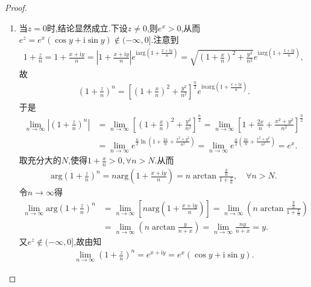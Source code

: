 \documentclass[../../main.tex]{subfiles}%
\begin{document}
\begin{proof}
\begin{enumerate}[(1)]
\item 当$z=0$时,结论显然成立.下设$z\neq 0$,则$e^x>0$,从而$e^z=e^x(\cos y+\text{i}\sin y)\notin (-\infty, 0]$.注意到
\begin{align*}
1+\frac{z}{n}=1+\frac{x+\mathrm{i}y}{n}=\left| 1+\frac{x+\mathrm{i}y}{n} \right|e^{\mathrm{iarg}\left( 1+\frac{x+\mathrm{i}y}{n} \right)}=\sqrt{\left( 1+\frac{x}{n} \right) ^2+\frac{y^2}{n^2}}e^{\mathrm{iarg}\left( 1+\frac{x+\mathrm{i}y}{n} \right)},
\end{align*}
故
\begin{align*}
\left( 1+\frac{z}{n} \right) ^n=\left[ \left( 1+\frac{x}{n} \right) ^2+\frac{y^2}{n^2} \right] ^{\frac{n}{2}}e^{\mathrm{i}n\mathrm{arg}\left( 1+\frac{x+\mathrm{i}y}{n} \right)}.
\end{align*}
于是
\begin{align*}
\lim\limits_{n\rightarrow \infty}\left| \left( 1+\frac{z}{n} \right) ^n \right|&=\lim\limits_{n\rightarrow \infty}\left[ \left( 1+\frac{x}{n} \right) ^2+\frac{y^2}{n^2} \right] ^{\frac{n}{2}}=\lim\limits_{n\rightarrow \infty}\left[ 1+\frac{2x}{n}+\frac{x^2+y^2}{n^2} \right] ^{\frac{n}{2}}\\
&=\lim\limits_{n\rightarrow \infty}e^{\frac{n}{2}\ln \left( 1+\frac{2x}{n}+\frac{x^2+y^2}{n^2} \right)}=\lim\limits_{n\rightarrow \infty}e^{\frac{n}{2}\left( \frac{2x}{n}+\frac{x^2+y^2}{n^2} \right)}=e^x.
\end{align*}
取充分大的$N$,使得$1+\frac{x}{n}>0,\forall n>N$.从而
\begin{align*}
\mathrm{arg}\left( 1+\frac{z}{n} \right) ^n=n\mathrm{arg}\left( 1+\frac{x+\mathrm{i}y}{n} \right) =n\arctan \frac{\frac{y}{n}}{1+\frac{x}{n}},\quad \forall n>N.
\end{align*}
令$n\rightarrow \infty$得
\begin{align*}
\lim\limits_{n\rightarrow \infty}\mathrm{arg}\left( 1+\frac{z}{n} \right) ^n&=\lim\limits_{n\rightarrow \infty}\left[ n\mathrm{arg}\left( 1+\frac{x+\mathrm{i}y}{n} \right) \right] =\lim\limits_{n\rightarrow \infty}\left( n\arctan \frac{\frac{y}{n}}{1+\frac{x}{n}} \right)\\
&=\lim\limits_{n\rightarrow \infty}\left( n\arctan \frac{y}{n+x} \right) =\lim\limits_{n\rightarrow \infty}\frac{ny}{n+x}=y.
\end{align*}
又$e^z\notin (-\infty, 0]$,故由知
\begin{align*}
\lim\limits_{n\rightarrow \infty}\left( 1+\frac{z}{n} \right) ^n=e^{x+\mathrm{i}y}=e^x\left( \cos y+\mathrm{i}\sin y \right).
\end{align*}


\end{enumerate}
\end{proof}
\end{document}
